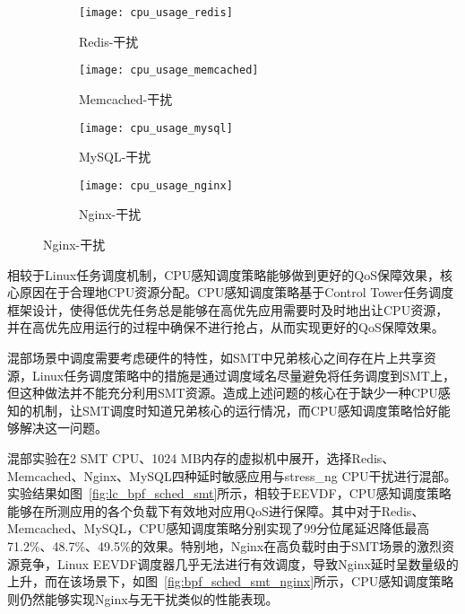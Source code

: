 \begin{figure}[H]
    \centering
    \begin{subfigure}[b]{0.33\textwidth}
        \texttt{[image: cpu\_usage\_redis]}
        \caption{Redis-干扰}
        \label{fig:cpu_usage_redis}
    \end{subfigure}
    \begin{subfigure}[b]{0.33\textwidth}
        \texttt{[image: cpu\_usage\_memcached]}
        \caption{Memcached-干扰}
        \label{fig:cpu_usage_memcached}
    \end{subfigure}
    \begin{subfigure}[b]{0.33\textwidth}
        \texttt{[image: cpu\_usage\_mysql]}
        \caption{MySQL-干扰}
        \label{fig:cpu_usage_mysql}
    \end{subfigure}
    \begin{subfigure}[b]{0.33\textwidth}
        \texttt{[image: cpu\_usage\_nginx]}
        \caption{Nginx-干扰}
        \label{fig:cpu_usage_nginx}
    \end{subfigure}
\label{fig:cpu_usage}
\end{figure}

相较于Linux任务调度机制，CPU感知调度策略能够做到更好的QoS保障效果，核心原因在于合理地CPU资源分配。CPU感知调度策略基于Control Tower任务调度框架设计，使得低优先任务总是能够在高优先应用需要时及时地出让CPU资源，并在高优先应用运行的过程中确保不进行抢占，从而实现更好的QoS保障效果。

混部场景中调度需要考虑硬件的特性，如SMT中兄弟核心之间存在片上共享资源，Linux任务调度策略中的措施是通过调度域名尽量避免将任务调度到SMT上，但这种做法并不能充分利用SMT资源。造成上述问题的核心在于缺少一种CPU感知的机制，让SMT调度时知道兄弟核心的运行情况，而CPU感知调度策略恰好能够解决这一问题。

混部实验在2 SMT CPU、1024 MB内存的虚拟机中展开，选择Redis、Memcached、Nginx、MySQL四种延时敏感应用与stress\_ng CPU干扰进行混部。实验结果如图~\ref{fig:lc_bpf_sched_smt}所示，相较于EEVDF，CPU感知调度策略能够在所测应用的各个负载下有效地对应用QoS进行保障。其中对于Redis、Memcached、MySQL，CPU感知调度策略分别实现了99分位尾延迟降低最高71.2\%、48.7\%、49.5\%的效果。特别地，Nginx在高负载时由于SMT场景的激烈资源竞争，Linux EEVDF调度器几乎无法进行有效调度，导致Nginx延时呈数量级的上升，而在该场景下，如图~\ref{fig:bpf_sched_smt_nginx}所示，CPU感知调度策略则仍然能够实现Nginx与无干扰类似的性能表现。

